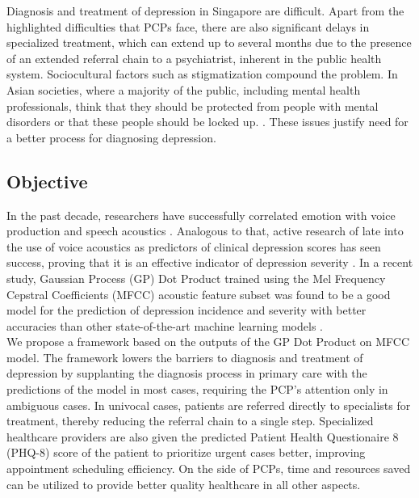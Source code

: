 \documentclass{article}
\begin{document}
    Diagnosis and treatment of depression in Singapore are difficult. Apart from the highlighted difficulties that PCPs face, there are also significant delays in specialized treatment, which can extend up to several months due to the presence of an extended referral chain to a psychiatrist, inherent in the public health system. Sociocultural factors such as stigmatization compound the problem. In Asian societies, where a majority of the public, including mental health professionals, think that they should be protected from people with mental disorders or that these people should be locked up. \cite{chong2009}. These issues justify need for a better process for diagnosing depression. \\
    
    \subsection{Objective}
    In the past decade, researchers have successfully correlated emotion with voice production and speech acoustics \cite{uwa2001}. 
    Analogous to that, active research of late into the use of voice acoustics as predictors of clinical depression scores has seen success, proving that it is an effective indicator of depression severity \cite{jov2016}. In a recent study, Gaussian Process (GP) Dot Product trained using the Mel Frequency Cepstral Coefficients (MFCC) acoustic feature subset was found to be a good model for the prediction of depression incidence and severity with better accuracies than other state-of-the-art machine learning models \cite{cs42462016}.\\

	We propose a framework based on the outputs of the GP Dot Product on MFCC model. The framework lowers the barriers to diagnosis and treatment of depression by supplanting the diagnosis process in primary care with the predictions of the model in most cases, requiring the PCP's attention only in ambiguous cases. In univocal cases, patients are referred directly to specialists for treatment, thereby reducing the referral chain to a single step. Specialized healthcare providers are also given the predicted Patient Health Questionaire 8 (PHQ-8) score of the patient to prioritize urgent cases better, improving appointment scheduling efficiency. On the side of PCPs, time and resources saved can be utilized to provide better quality healthcare in all other aspects.
	
\end{document}
